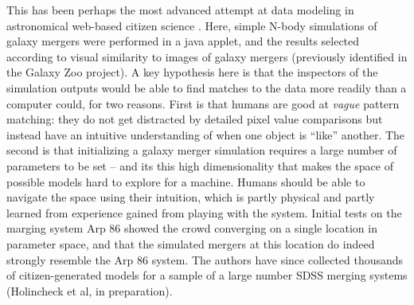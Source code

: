 \documentclass{ar2e}
\begin{document}


This has been perhaps the most advanced attempt at data modeling in 
astronomical web-based citizen science \citep{HolincheckEtal2010,WallinEtal2010}.
Here, simple N-body simulations of galaxy mergers were performed in a java
applet, and the results selected according to visual similarity to images of
galaxy mergers (previously identified in the Galaxy Zoo project). A key
hypothesis here is that the inspectors of the simulation outputs would be able
to find matches to the data more readily than a computer could, for two reasons.
First is that humans are good at {\it vague} pattern matching: they do not get
distracted by detailed pixel value comparisons but instead have an intuitive
understanding of when one object is ``like'' another. The second is that
initializing a galaxy merger simulation requires a large number of parameters to
be set -- and its this high dimensionality  that makes the space of possible
models hard to explore for a machine. Humans should be able to navigate the
space using their intuition, which is partly physical and partly learned from
experience gained from playing with the system. Initial tests on the marging
system Arp 86 showed
the crowd converging on a single location in parameter space, and that the
simulated mergers at this location do indeed strongly resemble the Arp 86
system. The authors have since collected thousands of citizen-generated models
for a sample of a large number SDSS merging systems (Holincheck et al, in
preparation). 
\end{document}
